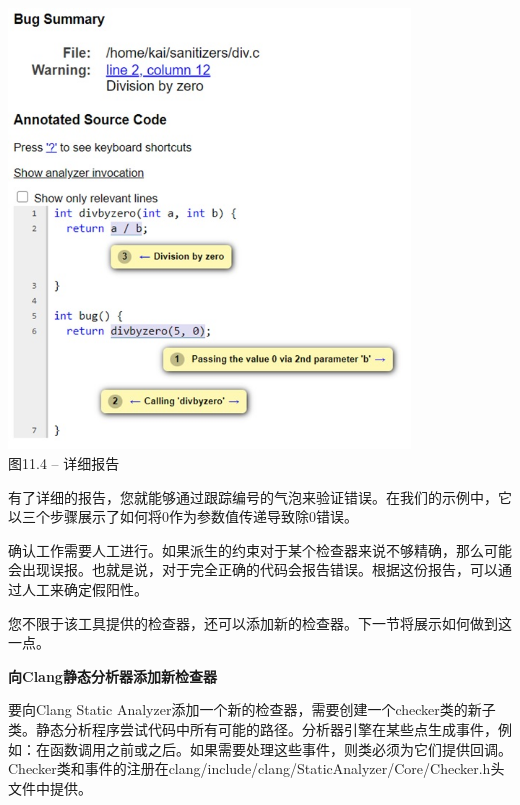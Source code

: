 \hspace*{\fill} \par %
\begin{center}
\includegraphics[width=0.8\textwidth]{content/3/chapter11/images/4.jpg}\\
图11.4 – 详细报告
\end{center}

有了详细的报告，您就能够通过跟踪编号的气泡来验证错误。在我们的示例中，它以三个步骤展示了如何将0作为参数值传递导致除0错误。\par
 
确认工作需要人工进行。如果派生的约束对于某个检查器来说不够精确，那么可能会出现误报。也就是说，对于完全正确的代码会报告错误。根据这份报告，可以通过人工来确定假阳性。\par

您不限于该工具提供的检查器，还可以添加新的检查器。下一节将展示如何做到这一点。\par


\hspace*{\fill} \par %
\textbf{向Clang静态分析器添加新检查器}

要向Clang Static Analyzer添加一个新的检查器，需要创建一个checker类的新子类。静态分析程序尝试代码中所有可能的路径。分析器引擎在某些点生成事件，例如：在函数调用之前或之后。如果需要处理这些事件，则类必须为它们提供回调。Checker类和事件的注册在clang/include/clang/Stat\allowbreak icAnalyzer/Core/Checker.h头文件中提供。\par

